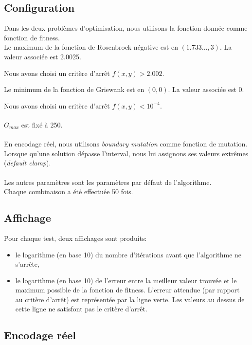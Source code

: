 \documentclass[12pt, letterpaper]{article}
\begin{document}
\subsection{Configuration}
Dans les deux problèmes d'optimisation, nous utilisons la fonction
donnée comme fonction de fitness.
\\
Le maximum de la fonction de Rosenbrock négative est en
$(1.733..., 3)$. La valeur associée est 2.0025.

Nous avons choisi un critère d'arrêt $f(x, y) > 2.002$.

Le minimum de la fonction de Griewank est en $(0, 0)$. La valeur associée est
0.

Nous avons choisi un critère d'arrêt $f(x, y) < 10^{-4}$.
\\
\\
$G_{max}$ est fixé à 250.
\\
\\
En encodage réel, nous utilisons \textit{boundary mutation} comme fonction
de mutation.
\\
Lorsque qu'une solution dépasse l'interval, nous lui assignons ses
valeurs extrêmes (\textit{default clamp}).
\\
\\
Les autres paramètres sont les paramètres par défaut de l'algorithme.
\\
Chaque combinaison a été effectuée 50 fois.

\subsection{Affichage}
Pour chaque test, deux affichages sont produits:
\begin{itemize}
  
\item le logarithme (en base 10) du nombre d'itérations avant que
  l'algorithme ne s'arrête,
  
\item le logarithme (en base 10) de l'erreur entre la meilleur valeur
  trouvée et le maximum possible de la fonction de fitness. L'erreur
  attendue (par rapport au critère d'arrêt) est représentée par la
  ligne verte. Les valeurs au dessus de cette ligne ne satisfont pas
  le critère d'arrêt.

\end{itemize}

\subsection{Encodage réel}
\end{document}
